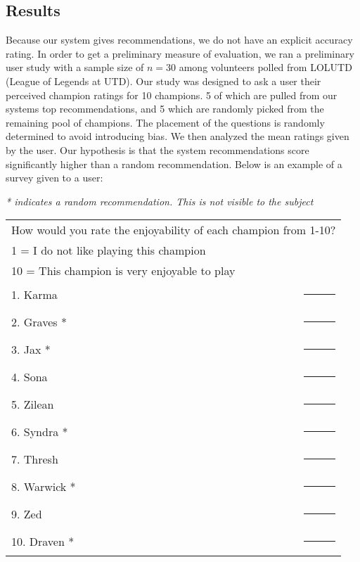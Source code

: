 \documentclass [11pt]{IEEEtran}
\begin{document}
\subsection{Results}
Because our system gives recommendations, we do not have an explicit accuracy rating. In order to get a preliminary measure of evaluation, we ran a preliminary user study with a sample size of $n=30$ among volunteers polled from LOLUTD (League of Legends at UTD). Our study was designed to ask a user their perceived champion ratings for 10 champions. 5 of which are pulled from our systems top recommendations, and 5 which are randomly picked from the remaining pool of champions. The placement of the questions is randomly determined to avoid introducing bias. We then analyzed the mean ratings given by the user. Our hypothesis is that the system recommendations score significantly higher than a random recommendation. Below is an example of a survey given to a user: 
\begin{flushleft} 
\textit{* indicates a random recommendation. This is not visible to the subject}\\
\centering
\begingroup
\setlength{\tabcolsep}{10pt} %
\renewcommand{\arraystretch}{1.5} %
\begin{tabular}{|l r|}
    \hline
    \multicolumn{2}{|p{.9\linewidth}|}{%
    How would you rate the enjoyability of each champion from 1-10?} \\
    \multicolumn{2}{|p{.9\linewidth}|}{1 = I do not like playing this champion} \\
    \multicolumn{2}{|p{.9\linewidth}|}{10 = This champion is very enjoyable to play} \\
     1. Karma & \rule{1cm}{1pt} \\ 
     2. Graves *  & \rule{1cm}{1pt} \\
     3. Jax * & \rule{1cm}{1pt} \\
     4. Sona & \rule{1cm}{1pt} \\
     5. Zilean & \rule{1cm}{1pt} \\
     6. Syndra * & \rule{1cm}{1pt} \\
     7. Thresh & \rule{1cm}{1pt} \\
     8. Warwick * & \rule{1cm}{1pt} \\
     9. Zed & \rule{1cm}{1pt} \\ 
     10. Draven * & \rule{1cm}{1pt} \\
     \hline
\end{tabular}
\endgroup
\end{flushleft}
\end{document}

